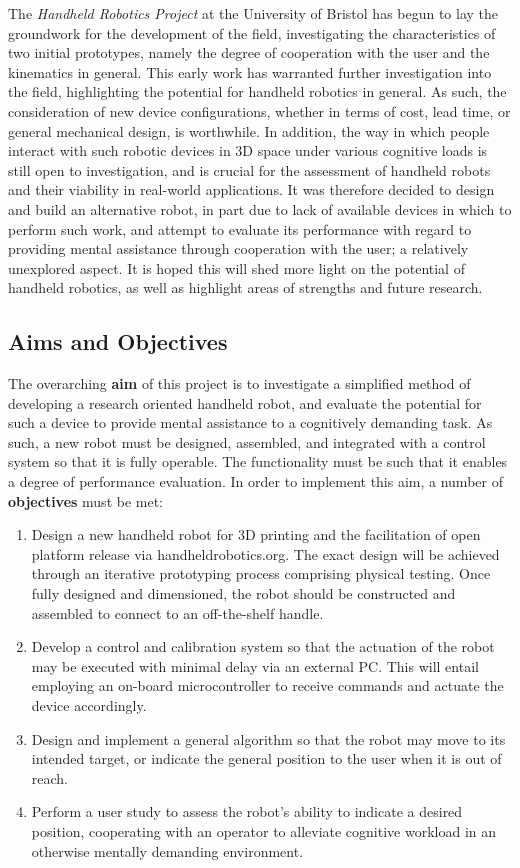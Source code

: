 \documentclass[11pt]{article}
\begin{document}
The \textit{Handheld Robotics Project} at the University of Bristol \cite{handheldrobotics} has begun to lay the groundwork for the development of the field, investigating the characteristics of two initial prototypes, namely the degree of cooperation with the user and the kinematics in general. This early work has warranted further investigation into the field, highlighting the potential for handheld robotics in general. As such, the consideration of new device configurations, whether in terms of cost, lead time, or general mechanical design, is worthwhile. In addition, the way in which people interact with such robotic devices in 3D space under various cognitive loads is still open to investigation, and is crucial for the assessment of handheld robots and their viability in real-world applications. It was therefore decided to design and build an alternative robot, in part due to lack of available devices in which to perform such work, and attempt to evaluate its performance with regard to providing mental assistance through cooperation with the user; a relatively unexplored aspect. It is hoped this will shed more light on the potential of handheld robotics, as well as highlight areas of strengths and future research.




\subsection{Aims and Objectives}
The overarching \textbf{aim} of this project is to investigate a simplified method of developing a research oriented handheld robot, and evaluate the potential for such a device to provide mental assistance to a cognitively demanding task. As such, a new robot must be designed, assembled, and integrated with a control system so that it is fully operable. The functionality must be such that it enables a degree of performance evaluation. In order to implement this aim, a number of \textbf{objectives} must be met:
\begin{enumerate}
\item{Design a new handheld robot for 3D printing and the facilitation of open platform release via handheldrobotics.org. The exact design will be achieved through an iterative prototyping process comprising physical testing. Once fully designed and dimensioned, the robot should be constructed and assembled to connect to an off-the-shelf handle.}
\item{Develop a control and calibration system so that the actuation of the robot may be executed with minimal delay via an external PC. This will entail employing an on-board microcontroller to receive commands and actuate the device accordingly.}
\item{Design and implement a general algorithm so that the robot may move to its intended target, or indicate the general position to the user when it is out of reach.}
\item{Perform a user study to assess the robot's ability to indicate a desired position, cooperating with an operator to alleviate cognitive workload in an otherwise mentally demanding environment.}
\end{enumerate}
\end{document}
